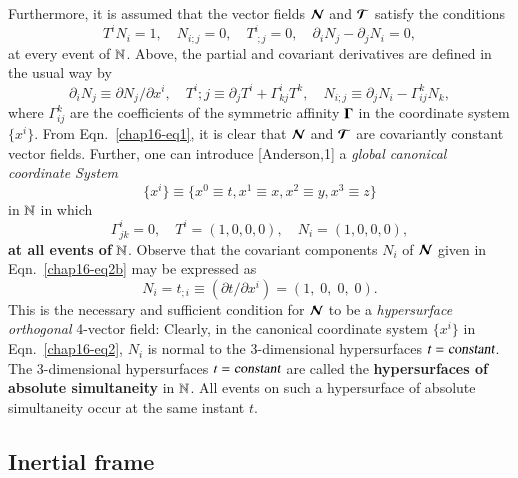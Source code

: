 Furthermore, it is  assumed that the vector fields $\bm{\mathcal{N}}$ and $\bm{\mathcal{T}}$ satisfy the conditions 
\setcounter{equation}{0}
\begin{equation}
T^i N_i =1,\quad  N_{i;j}=0, \quad  T^i_{\;;j}=0, \quad  \partial_i  N_j - \partial_j N_i=0,\label{chap16-eq1} 
\end{equation}
at every event of $\mathbb{N}$. Above,  the partial  and covariant derivatives are defined in the usual way by
\begin{equation*}
\partial_i  N_j\equiv \partial N_j/\partial x^i,\quad T^i;j\equiv\partial_j  T^i+\Gamma^i_{kj} T^k,\quad N_{i;j}\equiv\partial_j  N_i-\Gamma^k_{ij} N_k,
\end{equation*}
where $\Gamma^k_{ij}$ are the coefficients of the symmetric affinity $\mathbf{\Gamma}$ in the coordinate system $\{x^i\}$. From Eqn.~\eqref{chap16-eq1}, it is clear that $\bm{\mathcal{N}}$ and $\bm{\mathcal{T}}$ are covariantly constant vector fields. Further, one can introduce [Anderson,1] a \textsl{global canonical coordinate System} 
\begin{equation}
\{x^i\}\equiv \{x^0\equiv t, x^1\equiv x,x^2\equiv y,x^3\equiv z\} \label{chap16-eq2}
\end{equation}
in  $\mathbb{N}$  in which 
\begin{equation*}
\Gamma^i_{jk}=0, \quad T^i=(1,0,0,0),\quad N_i=(1,0,0,0),\tag{2b}\label{chap16-eq2b}
\end{equation*}
\textbf{at all events of} $\mathbb{N}$. Observe that the covariant components $N_i$ of $\bm{\mathcal{N}}$ given in Eqn.~\eqref{chap16-eq2b} may be expressed as  
\begin{equation*}
N_i=t_{;i} \equiv (\partial t/\partial x^i)=(1,\;0,\;0,\;0).\tag{2c}\label{chap16-eq2c}
\end{equation*}
This is the necessary and sufficient condition for $\bm{\mathcal{N}}$ to be  a \textsl{hypersurface orthogonal} 4-vector field: Clearly, in the canonical coordinate system $\{x^i\}$  in Eqn.~\eqref{chap16-eq2}, $N_i$ is normal to the 3-dimensional hypersurfaces $t=\textsl{constant}$. The 3-dimensional hypersurfaces  $t=\textsl{constant}$  are called the \textbf{hypersurfaces of absolute simultaneity} in $\mathbb{N}$. All events on such a hypersurface of absolute simultaneity occur at the same instant $t$. 

\subsection{Inertial frame}\label{chap16-sec2.1}

